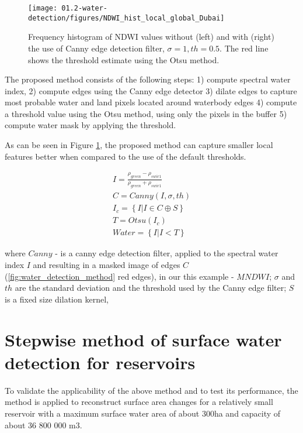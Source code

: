 \begin{figure}
	\centering
	\texttt{[image: 01.2-water-detection/figures/NDWI\_hist\_local\_global\_Dubai]}
	\caption{Frequency histogram of NDWI values without (left) and with (right) the use of Canny edge detection filter, $\sigma=1, th=0.5$. The red line shows the threshold estimate using the Otsu method.}
	\label{fig:water_detection_method_local_water_hist_Dubai}
\end{figure}

The proposed method consists of the following steps: 1) compute spectral water index, 2) compute edges using the Canny edge detector 3) dilate edges to capture most probable water and land pixels located around waterbody edges 4) compute a threshold value using the Otsu method, using only the pixels in the buffer 5) compute water mask by applying the threshold.

As can be seen in Figure \ref{fig:water_detection_method_local_water_hist_Dubai}, the proposed method can capture smaller local features better when compared to the use of the default thresholds.


\begin{gather}
I=\frac{\rho_{green}-\rho_{swir1}}{\rho_{green}+\rho_{swir1}} \\
C=Canny(I,\sigma,th) \\
I_c=\left\{ I | I \in C \oplus S \right\} \\
T=Otsu(I_c) \\
Water = \left\{ I | I < T \right\}
\end{gather}


where $Canny$ - is a canny edge detection filter, applied to the spectral water index $I$ and resulting in a masked image of edges $C$ (\ref{fig:water_detection_method} red edges), in our this example - $MNDWI$; $\sigma$ and $th$ are the standard deviation and the threshold used by the Canny edge filter; $S$ is a fixed size dilation kernel, 

\section{Stepwise method of surface water detection for reservoirs}

To validate the applicability of the above method and to test its performance, the method is applied to reconstruct surface area changes for a relatively small reservoir with a maximum surface water area of about 300ha and capacity of about 36 800 000 m3. 

